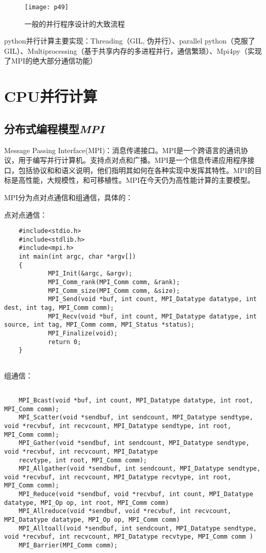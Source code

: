 \documentclass[utf8]{book}
\begin{document}
	\begin{figure}[H]
	\centering
	\texttt{[image: p49]}
	\caption{一般的并行程序设计的大致流程}
	\end{figure}
	
	python并行计算主要实现：Threading（GIL, 伪并行）、parallel python（克服了GIL）、Multiprocessing（基于共享内存的多进程并行，通信繁琐）、Mpi4py（实现了MPI的绝大部分通信功能）


	\section{CPU并行计算}
	
	\subsection{分布式编程模型\textit{MPI}}
	
	Message Passing Interface(MPI)：消息传递接口。MPI是一个跨语言的通讯协议，用于编写并行计算机。支持点对点和广播。MPI是一个信息传递应用程序接口，包括协议和和语义说明，他们指明其如何在各种实现中发挥其特性。MPI的目标是高性能，大规模性，和可移植性。MPI在今天仍为高性能计算的主要模型。
	
	MPI分为点对点通信和组通信，具体的：
	
	点对点通信：
	
	\begin{lstlisting}
	#include<stdio.h>
	#include<stdlib.h>
	#include<mpi.h>
	int main(int argc, char *argv[])
	{
			MPI_Init(&argc, &argv);
			MPI_Comm_rank(MPI_Comm comm, &rank);
			MPI_Comm_size(MPI_Comm comm, &size);
			MPI_Send(void *buf, int count, MPI_Datatype datatype, int dest, int tag, MPI_Comm comm);
			MPI_Recv(void *buf, int count, MPI_Datatype datatype, int source, int tag, MPI_Comm comm, MPI_Status *status);
			MPI_Finalize(void);
			return 0;
	}
	
	\end{lstlisting}
	
	组通信：
	\begin{lstlisting}
	
	MPI_Bcast(void *buf, int count, MPI_Datatype datatype, int root, MPI_Comm comm);
	MPI_Scatter(void *sendbuf, int sendcount, MPI_Datatype sendtype, void *recvbuf, int recvcount, MPI_Datatype sendtype, int root, MPI_Comm comm);
	MPI_Gather(void *sendbuf, int sendcount, MPI_Datatype sendtype, void *recvbuf, int recvcount, MPI_Datatype
	recvtype, int root, MPI_Comm comm);
	MPI_Allgather(void *sendbuf, int sendcount, MPI_Datatype sendtype, void *recvbuf, int recvcount, MPI_Datatype recvtype, int root, MPI_Comm comm);
	MPI_Reduce(void *sendbuf, void *recvbuf, int count, MPI_Datatype datatype, MPI_Op op, int root, MPI_Comm comm)
	MPI_Allreduce(void *sendbuf, void *recvbuf, int recvcount, MPI_Datatype datatype, MPI_Op op, MPI_Comm comm)
	MPI_Alltoall(void *sendbuf, int sendcount, MPI_Datatype sendtype, void *recvbuf, int recvcount, MPI_Datatype recvtype, MPI_Comm comm )
	MPI_Barrier(MPI_Comm comm);
	
	\end{lstlisting}
	
\end{document}
